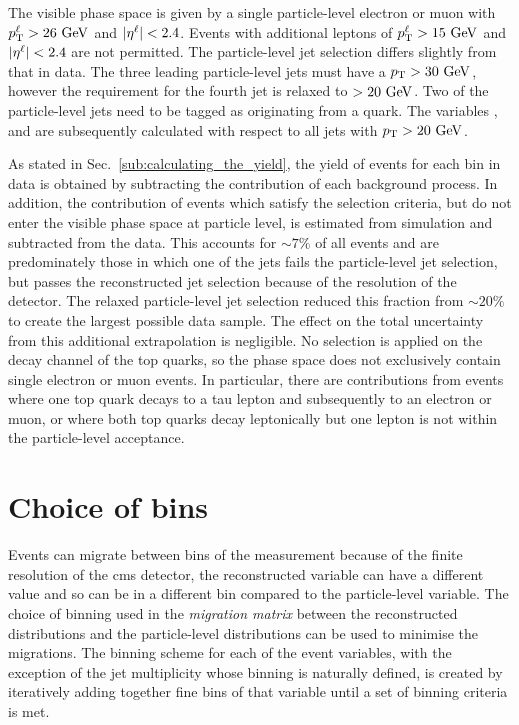 The visible phase space is given by a single particle-level electron or muon with $p_{\mathrm{T}}^{\ell}>26\mathrm{~Ge\hspace{-.08em}V}^{}$ and $\lvert \eta^{\ell} \rvert<2.4$.
Events with additional leptons of $p_{\mathrm{T}}^{\ell}>15\mathrm{~Ge\hspace{-.08em}V}^{}$ and $\lvert \eta^{\ell} \rvert<2.4$ are not permitted.
The particle-level jet selection differs slightly from that in data.
The three leading particle-level jets must have a $p_{\mathrm{T}}>30\mathrm{~Ge\hspace{-.08em}V}^{}$, however the \pt{} requirement for the fourth jet is relaxed to $>20\mathrm{~Ge\hspace{-.08em}V}^{}$.
Two of the particle-level jets need to be tagged as originating from a \bquark{} quark.
The variables \HT{}, \ST{} and \NJET{} are subsequently calculated with respect to all jets with $p_{\mathrm{T}}>20\mathrm{~Ge\hspace{-.08em}V}^{}$. 

As stated in Sec.~\ref{sub:calculating_the_yield}, the yield of \ttbar{} events for each bin in data is obtained by subtracting the contribution of each background process. In addition, the contribution of \ttbar events which satisfy the selection criteria, but do not enter the visible phase space at particle level, is estimated from simulation and subtracted from the data. 
This accounts for $\sim7\%$ of all \ttbar{} events and are predominately those
in which one of the jets fails the particle-level jet selection, but passes the reconstructed jet selection because of the resolution of the detector. 
The relaxed particle-level jet selection reduced this fraction from $\sim20\%$ to create the largest possible data sample.
The effect on the total uncertainty from this additional extrapolation is negligible.
No selection is applied on the decay channel of the top quarks, so the phase space does not exclusively contain single electron or muon \ttbar{} events. 
In particular, there are contributions from events where one top quark decays to a tau lepton and subsequently to an electron or muon, or where both top quarks decay leptonically but one lepton is not within the particle-level acceptance.

\section{Choice of bins} %
\label{sec:choice_of_bins}

Events can migrate between bins of the measurement because of the finite resolution of the \acrshort{cms} detector, \ie{} the reconstructed variable can have a different value and so can be in a different bin compared to the particle-level variable.  
The choice of binning used in the \textit{migration matrix} between the reconstructed distributions and the particle-level distributions can be used to minimise the migrations.
The binning scheme for each of the event variables, with the exception of the jet multiplicity whose binning is naturally defined, is created by iteratively adding together fine bins of that variable until a set of binning criteria is met.

